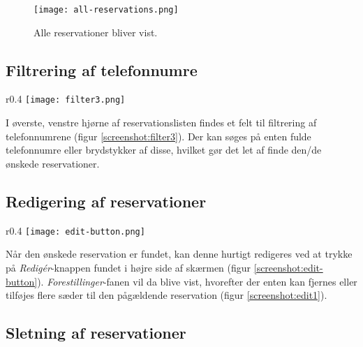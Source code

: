 \begin{figure}[h]
  \centering
  \texttt{[image: all-reservations.png]}
  \caption{Alle reservationer bliver vist.}
  \label{screenshot:all-reservations}
\end{figure}

\subsection{Filtrering af telefonnumre}

\begin{wrapfigure}[3]{r}{0.4\textwidth}
  \centering
  \vspace{-12pt}
  \texttt{[image: filter3.png]}
  \caption{Filtrering af telefonnumre}
  \label{screenshot:filter3}
\end{wrapfigure}

I øverste, venstre hjørne af reservationslisten findes et felt til filtrering af telefonnumrene (figur \ref{screenshot:filter3}). Der kan søges på enten fulde telefonnumre eller brydstykker af disse, hvilket gør det let af finde den/de ønskede reservationer.

\subsection{Redigering af reservationer}

\begin{wrapfigure}{r}{0.4\textwidth}
  \centering
  \vspace{-12pt}
  \texttt{[image: edit-button.png]}
  \caption{Mulighed for at redigere den enkelte reservation.}
  \label{screenshot:edit-button}
\end{wrapfigure}

Når den ønskede reservation er fundet, kan denne hurtigt redigeres ved at trykke på \textit{Redigér}-knappen fundet i højre side af skærmen (figur \ref{screenshot:edit-button}). \textit{Forestillinger}-fanen vil da blive vist, hvorefter der enten kan fjernes eller tilføjes flere sæder til den pågældende reservation (figur \ref{screenshot:edit1}).


\subsection{Sletning af reservationer}

